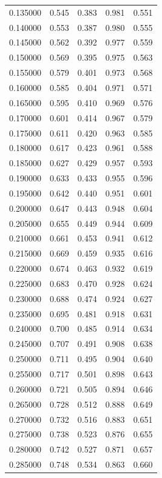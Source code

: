 \begin{table}[htbp]
\begin{tabular}{lllll}
0.135000 & 0.545 & 0.383 & 0.981 & 0.551 \\
0.140000 & 0.553 & 0.387 & 0.980 & 0.555 \\
0.145000 & 0.562 & 0.392 & 0.977 & 0.559 \\
0.150000 & 0.569 & 0.395 & 0.975 & 0.563 \\
0.155000 & 0.579 & 0.401 & 0.973 & 0.568 \\
0.160000 & 0.585 & 0.404 & 0.971 & 0.571 \\
0.165000 & 0.595 & 0.410 & 0.969 & 0.576 \\
0.170000 & 0.601 & 0.414 & 0.967 & 0.579 \\
0.175000 & 0.611 & 0.420 & 0.963 & 0.585 \\
0.180000 & 0.617 & 0.423 & 0.961 & 0.588 \\
0.185000 & 0.627 & 0.429 & 0.957 & 0.593 \\
0.190000 & 0.633 & 0.433 & 0.955 & 0.596 \\
0.195000 & 0.642 & 0.440 & 0.951 & 0.601 \\
0.200000 & 0.647 & 0.443 & 0.948 & 0.604 \\
0.205000 & 0.655 & 0.449 & 0.944 & 0.609 \\
0.210000 & 0.661 & 0.453 & 0.941 & 0.612 \\
0.215000 & 0.669 & 0.459 & 0.935 & 0.616 \\
0.220000 & 0.674 & 0.463 & 0.932 & 0.619 \\
0.225000 & 0.683 & 0.470 & 0.928 & 0.624 \\
0.230000 & 0.688 & 0.474 & 0.924 & 0.627 \\
0.235000 & 0.695 & 0.481 & 0.918 & 0.631 \\
0.240000 & 0.700 & 0.485 & 0.914 & 0.634 \\
0.245000 & 0.707 & 0.491 & 0.908 & 0.638 \\
0.250000 & 0.711 & 0.495 & 0.904 & 0.640 \\
0.255000 & 0.717 & 0.501 & 0.898 & 0.643 \\
0.260000 & 0.721 & 0.505 & 0.894 & 0.646 \\
0.265000 & 0.728 & 0.512 & 0.888 & 0.649 \\
0.270000 & 0.732 & 0.516 & 0.883 & 0.651 \\
0.275000 & 0.738 & 0.523 & 0.876 & 0.655 \\
0.280000 & 0.742 & 0.527 & 0.871 & 0.657 \\
0.285000 & 0.748 & 0.534 & 0.863 & 0.660 \\

\end{tabular}
\end{table}
